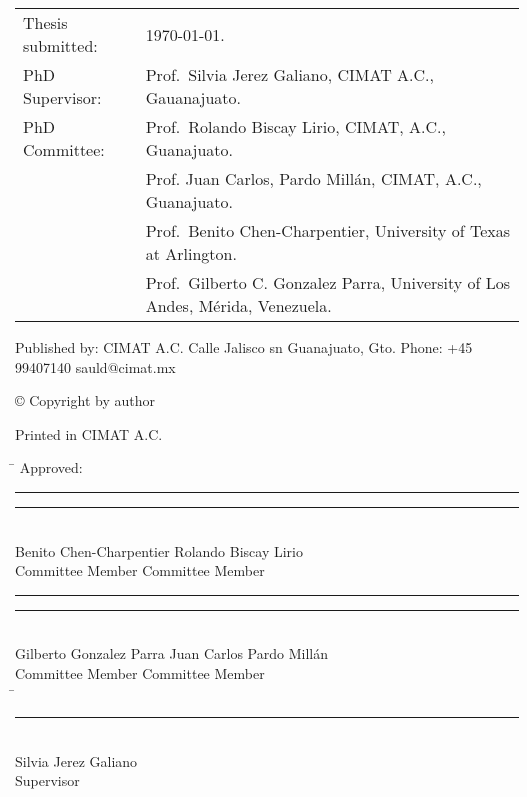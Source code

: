 \thispagestyle{empty}
\noindent
\begin{tabularx}{\textwidth}{@{}lX}
		Thesis submitted:	& \today.\\
		PhD Supervisor:		& Prof.\ Silvia Jerez Galiano, CIMAT A.C., Gauanajuato. \\
		PhD Committee:		& Prof.\ Rolando Biscay Lirio, CIMAT, A.C., Guanajuato. \\
			& Prof. Juan Carlos, Pardo Millán, CIMAT, A.C., Guanajuato.     \\
			& Prof.\ Benito Chen-Charpentier, University of Texas at Arlington. \\
			& Prof.\ Gilberto C. Gonzalez Parra, University of Los Andes, M\'erida, Venezuela.\\
\end{tabularx}
\strut\vfill
\noindent
	\noindent Published by:\newline
	CIMAT A.C. \newline
	Calle Jalisco sn\newline
	Guanajuato, Gto.\newline
	Phone: +45 99407140\newline
	sauld@cimat.mx\newline
	\strut\vfill
	\noindent \copyright{} Copyright by author\newline
	\strut\vfill
	\noindent Printed in CIMAT A.C. 
	\strut\vfill\vfill\vfill
	\clearpage
\begin{tabbing}
	\mbox{\hspace{95mm}}\= \kill
	\huge{Approved}: \\[1.5in]
	\rule{60mm}{.1mm}          \> \rule{60mm}{.1mm}    \\
	Benito Chen-Charpentier     \>  Rolando Biscay Lirio           \\
	Committee Member           \>  Committee Member    \\[1.5in]	
	\rule{60mm}{.1mm}          \>  \rule{60mm}{.1mm}   \\
	Gilberto Gonzalez Parra    \>  Juan Carlos Pardo Millán \\
	Committee Member           \>  Committee Member\\  [1.5in]
	\mbox{\hspace{47mm}}\= \kill
	\> \rule{60mm}{.1mm}\\
	\> Silvia Jerez Galiano
	\\  
	\>Supervisor \\[.2in]
\end{tabbing}
